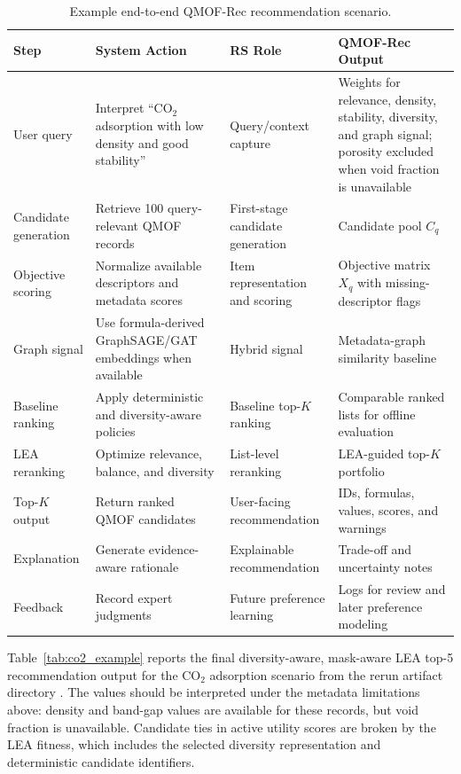 \documentclass[12pt,a4paper]{article}
\begin{document}
\begin{table}[H]
\centering
\caption{Example end-to-end QMOF-Rec recommendation scenario.}
\label{tab:workflow}
\small
\begin{tabular}{L{2.2cm} L{3.4cm} L{2.8cm} L{4.3cm}}
\toprule
\textbf{Step} & \textbf{System Action} & \textbf{RS Role} & \textbf{QMOF-Rec Output}\\
\midrule
User query & Interpret ``CO$_2$ adsorption with low density and good stability'' & Query/context capture & Weights for relevance, density, stability, diversity, and graph signal; porosity excluded when void fraction is unavailable\\
Candidate generation & Retrieve 100 query-relevant QMOF records & First-stage candidate generation & Candidate pool $C_q$\\
Objective scoring & Normalize available descriptors and metadata scores & Item representation and scoring & Objective matrix $X_q$ with missing-descriptor flags\\
Graph signal & Use formula-derived GraphSAGE/GAT embeddings when available & Hybrid signal & Metadata-graph similarity baseline\\
Baseline ranking & Apply deterministic and diversity-aware policies & Baseline top-$K$ ranking & Comparable ranked lists for offline evaluation\\
LEA reranking & Optimize relevance, balance, and diversity & List-level reranking & LEA-guided top-$K$ portfolio\\
Top-$K$ output & Return ranked QMOF candidates & User-facing recommendation & IDs, formulas, values, scores, and warnings\\
Explanation & Generate evidence-aware rationale & Explainable recommendation & Trade-off and uncertainty notes\\
Feedback & Record expert judgments & Future preference learning & Logs for review and later preference modeling\\
\bottomrule
\end{tabular}
\end{table}

Table~\ref{tab:co2_example} reports the final diversity-aware, mask-aware LEA top-5 recommendation output for the CO$_2$ adsorption scenario from the rerun artifact directory . The values should be interpreted under the metadata limitations above: density and band-gap values are available for these records, but void fraction is unavailable. Candidate ties in active utility scores are broken by the LEA fitness, which includes the selected diversity representation and deterministic candidate identifiers.
\end{document}

